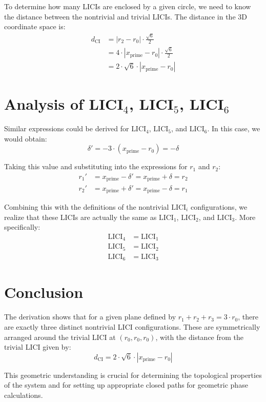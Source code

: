 \documentclass{article}
\begin{document}
To determine how many LICIs are enclosed by a given circle, we need to know the distance between the nontrivial and trivial LICIs. The distance in the 3D coordinate space is:
\begin{align}
d_{\text{CI}} &= |r_2 - r_0| \cdot \frac{\sqrt{6}}{2} \\
&= 4 \cdot |x_{\text{prime}} - r_0| \cdot \frac{\sqrt{6}}{2} \\
&= 2 \cdot \sqrt{6} \cdot |x_{\text{prime}} - r_0|
\end{align}

\section{Analysis of LICI$_4$, LICI$_5$, LICI$_6$}

Similar expressions could be derived for $\text{LICI}_4$, $\text{LICI}_5$, and $\text{LICI}_6$. In this case, we would obtain:
\begin{equation}
\delta' = -3 \cdot (x_{\text{prime}} - r_0) = -\delta
\end{equation}

Taking this value and substituting into the expressions for $r_1$ and $r_2$:
\begin{align}
r_1' &= x_{\text{prime}} - \delta' = x_{\text{prime}} + \delta = r_2 \\
r_2' &= x_{\text{prime}} + \delta' = x_{\text{prime}} - \delta = r_1
\end{align}

Combining this with the definitions of the nontrivial $\text{LICI}_i$ configurations, we realize that these LICIs are actually the same as $\text{LICI}_1$, $\text{LICI}_2$, and $\text{LICI}_3$. More specifically:
\begin{align}
\text{LICI}_4 &= \text{LICI}_1 \\
\text{LICI}_5 &= \text{LICI}_2 \\
\text{LICI}_6 &= \text{LICI}_3
\end{align}

\section{Conclusion}

The derivation shows that for a given plane defined by $r_1 + r_2 + r_3 = 3 \cdot r_0$, there are exactly three distinct nontrivial LICI configurations. These are symmetrically arranged around the trivial LICI at $(r_0, r_0, r_0)$, with the distance from the trivial LICI given by:
\begin{equation}
d_{\text{CI}} = 2 \cdot \sqrt{6} \cdot |x_{\text{prime}} - r_0|
\end{equation}

This geometric understanding is crucial for determining the topological properties of the system and for setting up appropriate closed paths for geometric phase calculations.
\end{document}
